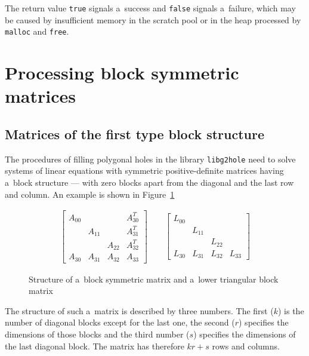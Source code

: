 The return value \texttt{true} signals a~success and \texttt{false}
signals a~failure, which may be caused by insufficient memory in the
scratch pool or in the heap processed by
\texttt{malloc} and \texttt{free}.


\newpage
\section{\label{sect:block:sym:array}Processing block symmetric matrices}

\subsection{Matrices of the first type block structure}

\begin{sloppypar}
The procedures of filling polygonal holes in the library \texttt{libg2hole}
need to solve systems of linear equations with symmetric positive-definite
matrices having a~block structure --- with zero blocks apart from the
diagonal and the last row and column. An example is shown in
Figure~\ref{fig:block:sympos}%
\end{sloppypar}
\begin{figure}[ht]
  \begin{align*}
    \left[\begin{array}{cccc}
      A_{00} & & & A_{30}^T \\
      & A_{11} & & A_{31}^T \\
      & & A_{22} & A_{32}^T \\
      A_{30} & A_{31} & A_{32} & A_{33} 
    \end{array}\right]\qquad
    \left[\begin{array}{cccc}
      L_{00} & & & \\
      & L_{11} & & \\
      & & L_{22} & \\
      L_{30} & L_{31} & L_{32} & L_{33} 
    \end{array}\right]
  \end{align*}
  \caption{\label{fig:block:sympos}Structure of a~block symmetric matrix and a~lower triangular block matrix}
\end{figure}

The structure of such a~matrix is described by three numbers.
The first ($k$) is the number of diagonal blocks except for the last one,
the second ($r$) specifies the dimensions of those blocks
and the third number ($s$) specifies the dimensions of the last diagonal block.
The matrix has therefore $kr+s$ rows and columns.

